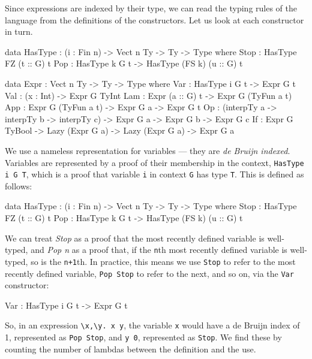 \noindent
Since expressions are indexed by their type, we can read the typing rules of the language from the definitions of the constructors.
Let us look at each constructor in turn.

\begin{code}[caption={Expression representation},label=exprty, float=htp]
data HasType : (i : Fin n) -> Vect n Ty -> Ty -> Type where
    Stop : HasType FZ (t :: G) t
    Pop  : HasType k G t -> HasType (FS k) (u :: G) t

data Expr : Vect n Ty -> Ty -> Type where
    Var : HasType i G t -> Expr G t
    Val : (x : Int) -> Expr G TyInt
    Lam : Expr (a :: G) t -> Expr G (TyFun a t)
    App : Expr G (TyFun a t) -> Expr G a -> Expr G t
    Op  : (interpTy a -> interpTy b -> interpTy c) ->
          Expr G a -> Expr G b -> Expr G c
    If  : Expr G TyBool ->
          Lazy (Expr G a) ->
          Lazy (Expr G a) -> Expr G a
\end{code}

\noindent
We use a nameless representation for variables --- they are \emph{de Bruijn indexed}.
Variables are represented by a proof of their membership in the context, \texttt{HasType i G T}, which is a proof that variable \texttt{i} in context  \texttt{G} has type \texttt{T}. This is defined as follows:

\begin{code}
data HasType : (i : Fin n) -> Vect n Ty -> Ty -> Type where
    Stop : HasType FZ (t :: G) t
    Pop  : HasType k G t -> HasType (FS k) (u :: G) t
\end{code}

\noindent
We can treat \emph{Stop} as a proof that the most recently defined variable is well-typed, and \emph{Pop n} as a proof that, if the \texttt{n}th most recently defined variable is well-typed, so is the \texttt{n+1}th.
In practice, this means we use \texttt{Stop} to refer to the most recently defined variable, \texttt{Pop Stop} to refer to the next, and so on, via the \texttt{Var} constructor:

\begin{code}
Var : HasType i G t -> Expr G t
\end{code}

\noindent
So, in an expression \verb!\x,\y. x y!, the variable \texttt{x} would have a de Bruijn index of 1, represented as \texttt{Pop Stop}, and \texttt{y 0}, represented as \texttt{Stop}.
We find these by counting the number of lambdas between the definition and the use.

